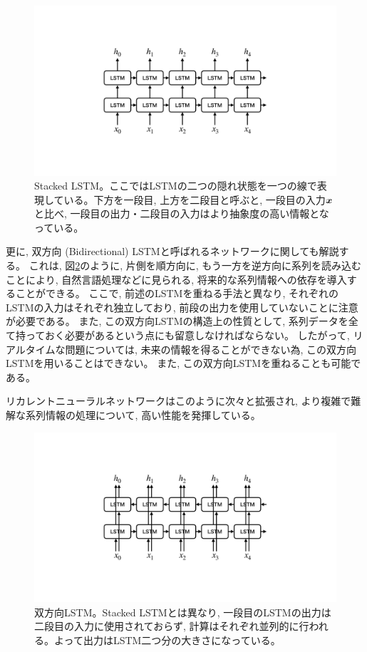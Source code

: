 \begin{figure}[htbp]
 \centering
 \includegraphics[trim = 0 200 0 200, width=1.0\textwidth, clip]{Figure/2DeepLearning/16StackedLSTM.png}
 \caption[Stacked LSTM]{Stacked LSTM。ここではLSTMの二つの隠れ状態を一つの線で表現している。下方を一段目, 上方を二段目と呼ぶと, 一段目の入力${\mbox{\boldmath{$x$}}}$と比べ, 一段目の出力・二段目の入力はより抽象度の高い情報となっている。}
 \label{16StackedLSTM}
\end{figure}
\newpage
更に, 双方向 (Bidirectional) LSTMと呼ばれるネットワークに関しても解説する。
これは, 図\ref{17BidirectionalLSTM}のように, 片側を順方向に, もう一方を逆方向に系列を読み込むことにより, 自然言語処理などに見られる, 将来的な系列情報への依存を導入することができる。
ここで, 前述のLSTMを重ねる手法と異なり, それぞれのLSTMの入力はそれぞれ独立しており, 前段の出力を使用していないことに注意が必要である。
また, この双方向LSTMの構造上の性質として, 系列データを全て持っておく必要があるという点にも留意しなければならない。
したがって, リアルタイムな問題については, 未来の情報を得ることができない為, この双方向LSTMを用いることはできない。
また, この双方向LSTMを重ねることも可能である。

リカレントニューラルネットワークはこのように次々と拡張され, より複雑で難解な系列情報の処理について, 高い性能を発揮している。

\begin{figure}[htbp]
 \centering
 \includegraphics[trim = 0 200 0 200, width=1.0\textwidth, clip]{Figure/2DeepLearning/17BidirectionalLSTM.png}
 \caption[双方向LSTM]{双方向LSTM。Stacked LSTMとは異なり, 一段目のLSTMの出力は二段目の入力に使用されておらず, 計算はそれぞれ並列的に行われる。よって出力はLSTM二つ分の大きさになっている。}
 \label{17BidirectionalLSTM}
\end{figure}

